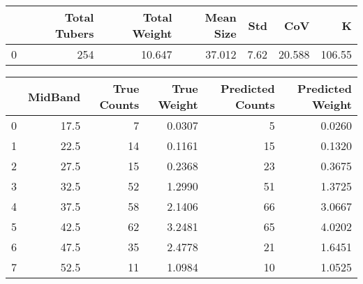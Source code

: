 \begin{tabular}{lrrrrrr}
\toprule
{} &  Total Tubers &  Total Weight &  Mean Size &   Std &     CoV &       K \\
\midrule
0 &           254 &        10.647 &     37.012 &  7.62 &  20.588 &  106.55 \\
\bottomrule
\end{tabular}

\begin{tabular}{lrrrrr}
\toprule
{} &  MidBand &  True Counts &  True Weight &  Predicted Counts &  Predicted Weight \\
\midrule
0 &     17.5 &            7 &       0.0307 &                 5 &            0.0260 \\
1 &     22.5 &           14 &       0.1161 &                15 &            0.1320 \\
2 &     27.5 &           15 &       0.2368 &                23 &            0.3675 \\
3 &     32.5 &           52 &       1.2990 &                51 &            1.3725 \\
4 &     37.5 &           58 &       2.1406 &                66 &            3.0667 \\
5 &     42.5 &           62 &       3.2481 &                65 &            4.0202 \\
6 &     47.5 &           35 &       2.4778 &                21 &            1.6451 \\
7 &     52.5 &           11 &       1.0984 &                10 &            1.0525 \\
\bottomrule
\end{tabular}

